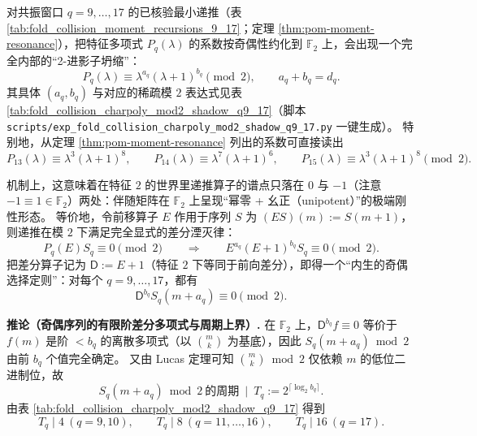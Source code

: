 \begin{remark}\label{rem:pom-charpoly-mod2-shadow}
对共振窗口 \(q=9,\dots,17\) 的已核验最小递推（表 \ref{tab:fold_collision_moment_recursions_9_17}；定理 \ref{thm:pom-moment-resonance}），把特征多项式 \(P_q(\lambda)\) 的系数按奇偶性约化到 \(\mathbb{F}_2\) 上，会出现一个完全内部的“2-进影子坍缩”：
\[
P_q(\lambda)\equiv \lambda^{a_q}(\lambda+1)^{b_q}\pmod 2,
\qquad a_q+b_q=d_q.
\]
其具体 \((a_q,b_q)\) 与对应的稀疏模 \(2\) 表达式见表 \ref{tab:fold_collision_charpoly_mod2_shadow_q9_17}（脚本 \texttt{scripts/exp\_fold\_collision\_charpoly\_mod2\_shadow\_q9\_17.py} 一键生成）。
特别地，从定理 \ref{thm:pom-moment-resonance} 列出的系数可直接读出
\[
P_{13}(\lambda)\equiv \lambda^3(\lambda+1)^8,\qquad
P_{14}(\lambda)\equiv \lambda^7(\lambda+1)^6,\qquad
P_{15}(\lambda)\equiv \lambda^3(\lambda+1)^8\pmod 2.
\]
\par
机制上，这意味着在特征 \(2\) 的世界里递推算子的谱点只落在 \(0\) 与 \(-1\)（注意 \(-1\equiv 1\in\mathbb{F}_2\)）两处：伴随矩阵在 \(\mathbb{F}_2\) 上呈现“幂零 + 幺正（unipotent）”的极端刚性形态。
等价地，令前移算子 \(E\) 作用于序列 \(S\) 为 \((ES)(m):=S(m+1)\)，则递推在模 \(2\) 下满足完全显式的差分湮灭律：
\[
P_q(E)S_q\equiv 0\pmod 2
\qquad\Longrightarrow\qquad
E^{a_q}(E+1)^{b_q}S_q\equiv 0\pmod 2.
\]
把差分算子记为 \(\mathsf{D}:=E+1\)（特征 \(2\) 下等同于前向差分），即得一个“内生的奇偶选择定则”：对每个 \(q=9,\dots,17\)，都有
\[
\mathsf{D}^{b_q}S_q(m+a_q)\equiv 0\pmod 2.
\]
\par
\textbf{推论（奇偶序列的有限阶差分多项式与周期上界）.}
在 \(\mathbb{F}_2\) 上，\(\mathsf{D}^{b_q}f\equiv 0\) 等价于 \(f(m)\) 是阶 \(<b_q\) 的离散多项式（以 \(\binom{m}{k}\) 为基底），因此 \(S_q(m+a_q)\bmod 2\) 由前 \(b_q\) 个值完全确定。
又由 Lucas 定理可知 \(\binom{m}{k}\bmod 2\) 仅依赖 \(m\) 的低位二进制位，故
\[
S_q(m+a_q)\bmod 2\ \text{的周期}\ \mid\ T_q:=2^{\lceil\log_2 b_q\rceil}.
\]
由表 \ref{tab:fold_collision_charpoly_mod2_shadow_q9_17} 得到
\[
T_q\mid 4\ (q=9,10),\qquad
T_q\mid 8\ (q=11,\dots,16),\qquad
T_q\mid 16\ (q=17).
\]
\end{remark}








